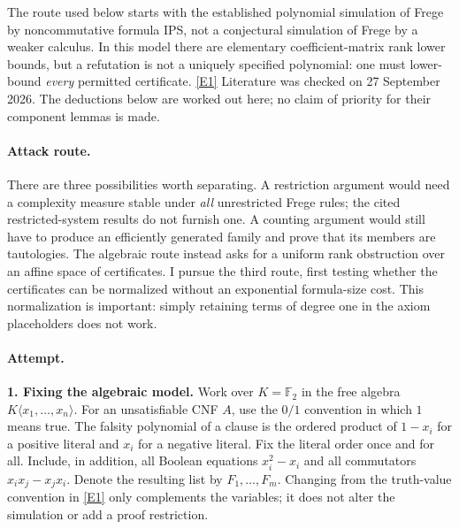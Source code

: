 \documentclass[11pt,a4paper]{article}
\newcommand{\eref}[2]{\hyperlink{extra:#1:#2}{[E#2]}}
\numberwithin{equation}{section}
\begin{document}
The route used below starts with the established polynomial simulation of
Frege by noncommutative formula IPS, not a conjectural simulation of Frege by a
weaker calculus. In this model there are elementary coefficient-matrix rank
lower bounds, but a refutation is not a uniquely specified polynomial:
one must lower-bound \emph{every} permitted certificate.
\eref{30006730}{1} Literature was checked on 27 September 2026. The deductions below
are worked out here; no claim of priority for their component lemmas is made.

\paragraph{Attack route.}
There are three possibilities worth separating. A restriction argument would
need a complexity measure stable under \emph{all} unrestricted Frege rules;
the cited restricted-system results do not furnish one. A counting argument
would still have to produce an efficiently generated family and prove that
its members are tautologies. The algebraic route instead asks for a uniform
rank obstruction over an affine space of certificates. I pursue the third
route, first testing whether the certificates can be normalized without an
exponential formula-size cost. This normalization is important: simply
retaining terms of degree one in the axiom placeholders does not work.

\paragraph{Attempt.}
\textbf{1. Fixing the algebraic model.}
Work over $K=\mathbb F_2$ in the free algebra $K\langle x_1,\ldots,x_n\rangle$.
For an unsatisfiable CNF $A$, use the $0/1$ convention in which $1$ means true.
The falsity polynomial of a clause is the ordered product of $1-x_i$ for a
positive literal and $x_i$ for a negative literal. Fix the literal order once
and for all. Include, in addition, all Boolean equations $x_i^2-x_i$ and all
commutators $x_ix_j-x_jx_i$. Denote the resulting list by $F_1,\ldots,F_m$.
Changing from the truth-value convention in \eref{30006730}{1} only complements the
variables; it does not alter the simulation or add a proof restriction.
\end{document}
